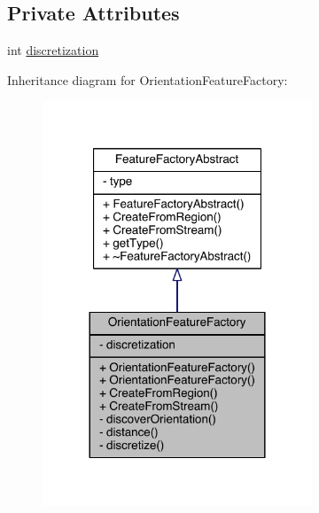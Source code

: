 \subsection*{Private Attributes}
\begin{DoxyCompactItemize}
\item 
int \hyperlink{class_orientation_feature_factory_abcd8932fe77877dff6657e4070882015}{discretization}
\end{DoxyCompactItemize}


Inheritance diagram for Orientation\+Feature\+Factory\+:
\nopagebreak
\begin{figure}[H]
\begin{center}
\leavevmode
\includegraphics[width=228pt]{class_orientation_feature_factory__inherit__graph}
\end{center}
\end{figure}


